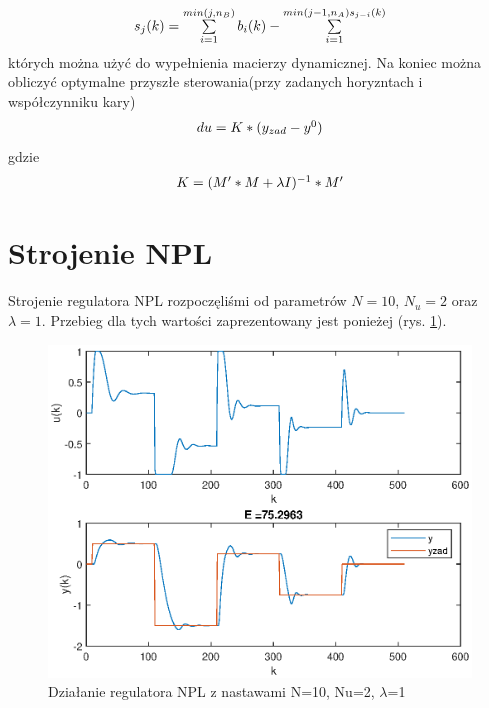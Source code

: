 		\begin{equation}
		\begin{tabular}{l}
		$s_j(k)=\sum\limits_{i=1}^{min(j,n_B)}b_i(k)-\sum\limits_{i=1}^{min(j-1,n_A)s_{j-i}(k)}$
		\end{tabular}
		\label{eq:NPL_odpowiedzskok}
		\end{equation}
		których można użyć do wypełnienia macierzy dynamicznej.
		Na koniec można obliczyć optymalne przyszłe sterowania(przy zadanych horyzntach i współczynniku kary)
		\begin{equation}
		\begin{tabular}{l}
		$du=K*(y_{zad}-y^0)$
		\end{tabular}
		\label{eq:NPL_du}
		\end{equation}
		gdzie
		\begin{equation}
		\begin{tabular}{l}
		$K=(M'*M+\lambda I)^{-1}*M'$
		\end{tabular}
		\label{eq:NPL_du}
		\end{equation}
	
		
		
	\section{Strojenie NPL}
		\label{sec:stroj_NPL}
		Strojenie regulatora NPL rozpoczęliśmi od parametrów $N=10$, $N_u=2$ oraz $\lambda=1$. Przebieg dla tych wartości zaprezentowany jest ponieżej (rys. \ref{fig:NPL0}).
		
		\begin{figure}[h!]
			\centering
			\includegraphics[width=\linewidth]{img/strojenieNPL_N_10_Nu_2_lam_1.eps}
			\caption{Działanie regulatora NPL z nastawami N=10, Nu=2, $\lambda$=1}
			\label{fig:NPL0}
		\end{figure}
		
